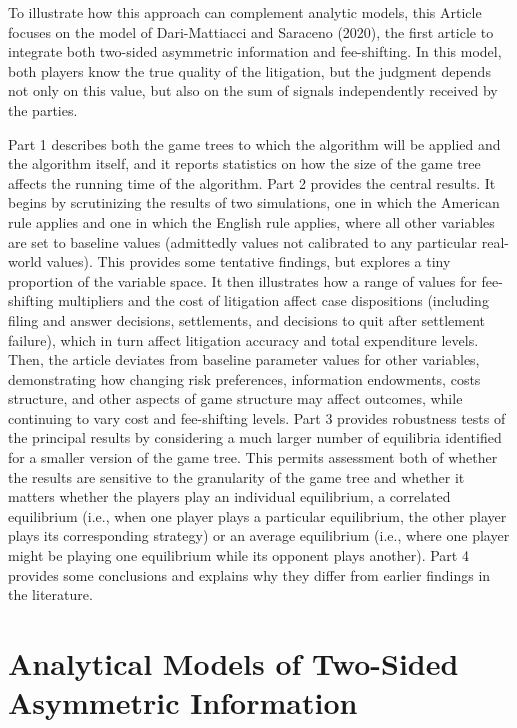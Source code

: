 \documentclass{article}
\begin{document}
To illustrate how this approach can complement analytic models, this Article focuses on the model of Dari-Mattiacci and Saraceno (2020), the first article to integrate both two-sided asymmetric information and fee-shifting. In this model, both players know the true quality of the litigation, but the judgment depends not only on this value, but also on the sum of signals independently received by the parties. 

Part 1 describes both the game trees to which the algorithm will be applied and the algorithm itself, and it reports statistics on how the size of the game tree affects the running time of the algorithm. Part 2 provides the central results. It begins by scrutinizing the results of two simulations, one in which the American rule applies and one in which the English rule applies, where all other variables are set to baseline values (admittedly values not calibrated to any particular real-world values). This provides some tentative findings, but explores a tiny proportion of the variable space. It then illustrates how a range of values for fee-shifting multipliers and the cost of litigation affect case dispositions (including filing and answer decisions, settlements, and decisions to quit after settlement failure), which in turn affect litigation accuracy and total expenditure levels. Then, the article deviates from baseline parameter values for other variables, demonstrating how changing risk preferences, information endowments, costs structure, and other aspects of game structure may affect outcomes, while continuing to vary cost and fee-shifting levels. Part 3 provides robustness tests of the principal results by considering a much larger number of equilibria identified for a smaller version of the game tree. This permits assessment both of whether the results are sensitive to the granularity of the game tree and whether it matters whether the players play an individual equilibrium, a correlated equilibrium (i.e., when one player plays a particular equilibrium, the other player plays its corresponding strategy) or an average equilibrium (i.e., where one player might be playing one equilibrium while its opponent plays another). Part 4 provides some conclusions and explains why they differ from earlier findings in the literature.

\section{Analytical Models of Two-Sided Asymmetric Information}
\end{document}
